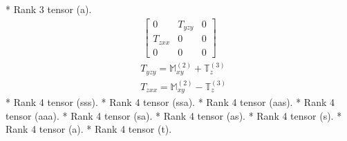 \documentclass[fleqn,8pt,landscape]{jsarticle}
\begin{document}
* Rank 3 tensor (a).
\begin{align*}
\begin{bmatrix} 0 & T_{yzy} & 0 \\ T_{zxx} & 0 & 0 \\ 0 & 0 & 0 \end{bmatrix}
\end{align*}
\begin{align*}
& T_{yzy} = \mathbb{M}_{xy}^{(2)} + \mathbb{T}_{z}^{(3)} \\
& T_{zxx} = \mathbb{M}_{xy}^{(2)} - \mathbb{T}_{z}^{(3)}
\end{align*}
* Rank 4 tensor (sss).
* Rank 4 tensor (ssa).
* Rank 4 tensor (aas).
* Rank 4 tensor (aaa).
* Rank 4 tensor (sa).
* Rank 4 tensor (as).
* Rank 4 tensor (s).
* Rank 4 tensor (a).
* Rank 4 tensor (t).
\end{document}

